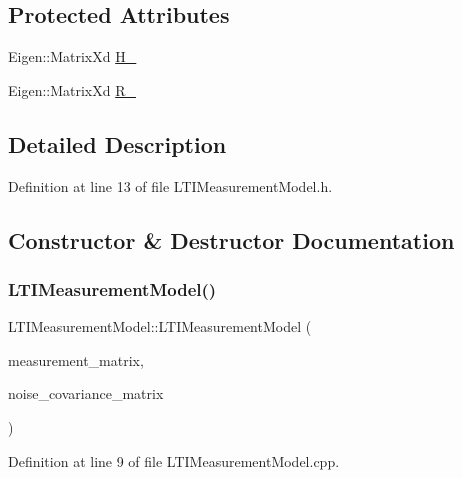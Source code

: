 \subsection*{Protected Attributes}
\begin{DoxyCompactItemize}
\item 
Eigen\+::\+Matrix\+Xd \mbox{\hyperlink{classbfl_1_1LTIMeasurementModel_a80d80b217b891b07294f1c854ccc65fd}{H\+\_\+}}
\item 
Eigen\+::\+Matrix\+Xd \mbox{\hyperlink{classbfl_1_1LTIMeasurementModel_a9939b62a6395e15873d43a445e6f8938}{R\+\_\+}}
\end{DoxyCompactItemize}


\subsection{Detailed Description}


Definition at line 13 of file L\+T\+I\+Measurement\+Model.\+h.



\subsection{Constructor \& Destructor Documentation}
\mbox{\label{classbfl_1_1LTIMeasurementModel_a3d308f4b8ea9591b9f927fcd2bd3c0e7}} 
\subsubsection{\texorpdfstring{L\+T\+I\+Measurement\+Model()}{LTIMeasurementModel()}}
{\footnotesize\ttfamily L\+T\+I\+Measurement\+Model\+::\+L\+T\+I\+Measurement\+Model (\begin{DoxyParamCaption}\item[{const Eigen\+::\+Ref$<$ const Eigen\+::\+Matrix\+Xd $>$ \&}]{measurement\+\_\+matrix,  }\item[{const Eigen\+::\+Ref$<$ const Eigen\+::\+Matrix\+Xd $>$ \&}]{noise\+\_\+covariance\+\_\+matrix }\end{DoxyParamCaption})}



Definition at line 9 of file L\+T\+I\+Measurement\+Model.\+cpp.



